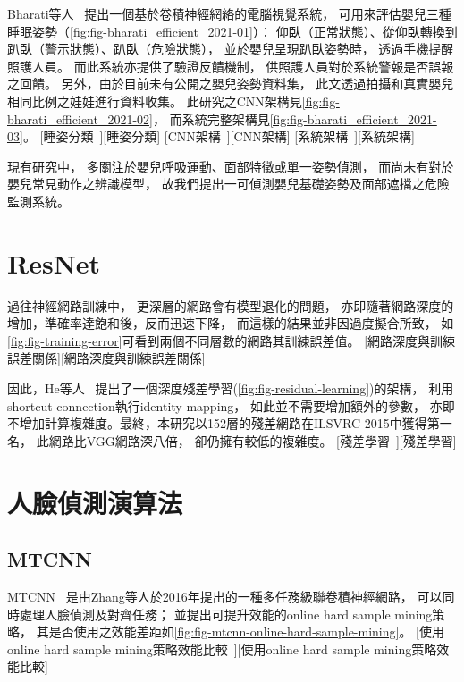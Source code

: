 \documentclass[class=NCU_thesis, crop=false]{standalone}
\begin{document}
Bharati等人~\cite{bharati_efficient_2021}
提出一個基於卷積神經網絡的電腦視覺系統，
可用來評估嬰兒三種睡眠姿勢（\cref{fig:fig-bharati_efficient_2021-01}）：
仰臥（正常狀態）、從仰臥轉換到趴臥（警示狀態）、趴臥（危險狀態），
並於嬰兒呈現趴臥姿勢時，
透過手機提醒照護人員。
而此系統亦提供了驗證反饋機制，
供照護人員對於系統警報是否誤報之回饋。
另外，由於目前未有公開之嬰兒姿勢資料集，
此文透過拍攝和真實嬰兒相同比例之娃娃進行資料收集。
此研究之CNN架構見\cref{fig:fig-bharati_efficient_2021-02}，
而系統完整架構見\cref{fig:fig-bharati_efficient_2021-03}。
[睡姿分類~\cite{bharati_efficient_2021}][睡姿分類]
[CNN架構~\cite{bharati_efficient_2021}][CNN架構]
[系統架構~\cite{bharati_efficient_2021}][系統架構]

現有研究中，
多關注於嬰兒呼吸運動、面部特徵或單一姿勢偵測，
而尚未有對於嬰兒常見動作之辨識模型，
故我們提出一可偵測嬰兒基礎姿勢及面部遮擋之危險監測系統。

\section{ResNet}
過往神經網路訓練中，
更深層的網路會有模型退化的問題，
亦即隨著網路深度的增加，準確率達飽和後，反而迅速下降，
而這樣的結果並非因過度擬合所致，
如\cref{fig:fig-training-error}可看到兩個不同層數的網路其訓練誤差值。
[網路深度與訓練誤差關係][網路深度與訓練誤差關係]

因此，He等人~\cite{he_deep_2016}
提出了一個深度殘差學習(\cref{fig:fig-residual-learning})的架構，
利用shortcut connection執行identity mapping，
如此並不需要增加額外的參數，
亦即不增加計算複雜度。最終，本研究以152層的殘差網路在ILSVRC 2015中獲得第一名，
此網路比VGG網路深八倍，
卻仍擁有較低的複雜度。
[殘差學習~\cite{he_deep_2016}][殘差學習]

\section{人臉偵測演算法}
\subsection{MTCNN}
MTCNN~\cite{zhang_joint_2016}
是由Zhang等人於2016年提出的一種多任務級聯卷積神經網路，
可以同時處理人臉偵測及對齊任務；
並提出可提升效能的online hard sample mining策略，
其是否使用之效能差距如\cref{fig:fig-mtcnn-online-hard-sample-mining}。
[使用online hard sample mining策略效能比較~\cite{zhang_joint_2016}][使用online hard sample mining策略效能比較]
\end{document}
